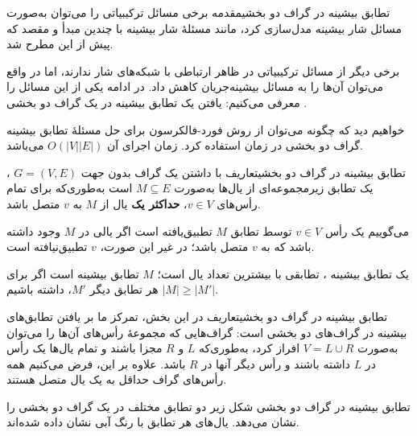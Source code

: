 \begin{itemframe-s}{تطابق بیشینه در گراف دو بخشی}{مقدمه}
\itm
برخی مسائل ترکیبیاتی را می‌توان به‌صورت مسائل شار بیشینه‌ مدل‌سازی کرد، مانند مسئلهٔ شار بیشینه با چندین مبدأ و مقصد که پیش از این مطرح شد.

\itm
برخی دیگر از مسائل ترکیبیاتی در ظاهر ارتباطی با شبکه‌های شار ندارند، اما در واقع می‌توان آن‌ها را به مسائل بیشینه‌جریان کاهش داد. در ادامه یکی از این مسائل را معرفی می‌کنیم:
 یافتن یک تطابق بیشینه در یک گراف دو بخشی
 .

\itm
خواهیم دید که چگونه می‌توان از روش فورد-فالکرسون برای حل مسئلهٔ تطابق بیشینه گراف دو بخشی
 در زمان استفاده کرد. زمان اجرای آن $O(|V||E|)$ می‌باشد.
\end{itemframe-s}


\begin{itemframe-s}{تطابق بیشینه در گراف دو بخشی}{تعاریف}
\itm
با داشتن یک گراف بدون جهت
$G = (V, E)$
، یک تطابق
 زیرمجموعه‌ای از یال‌ها به‌صورت
$M \subseteq E$
 است به‌طوری‌که برای تمام رأس‌های
$v \in V$،
 \textbf{حداکثر یک}
 یال از $M$ به $v$ متصل باشد.
\itm

می‌گوییم یک رأس $v \in V$ توسط تطابق $M$ تطبیق‌یافته
است اگر یالی در $M$ وجود داشته باشد که به $v$ متصل باشد؛ در غیر این صورت، $v$ تطبیق‌نیافته
 است.

\itm
یک تطابق بیشینه
، تطابقی با بیشترین تعداد یال است؛ $M$ تطابق بیشینه است اگر برای هر تطابق دیگر $M'$، داشته باشیم
$|M| \geq |M'|$.

\end{itemframe-s}


\begin{itemframe-s}{تطابق بیشینه در گراف دو بخشی}{تعاریف}
\itm
در این بخش، تمرکز ما بر یافتن تطابق‌های بیشینه در گراف‌های دو بخشی
 است: گراف‌هایی که مجموعهٔ رأس‌های آن‌ها را می‌توان به‌صورت
$V = L \cup R$
افراز کرد، به‌طوری‌که $L$ و $R$ مجزا باشند و تمام یال‌ها یک رأس در $L$ داشته باشند و رأس دیگر آنها در $R$ باشد.
\itm
علاوه بر این، فرض می‌کنیم همه رأس‌های گراف حداقل به یک یال متصل هستند.
\end{itemframe-s}


\begin{itemframe}{تطابق بیشینه در گراف دو بخشی}
\itm
شکل زیر دو تطابق مختلف در یک گراف دو بخشی را نشان می‌دهد. یال‌های هر تطابق با رنگ آبی نشان داده شده‌اند.

\end{itemframe}


